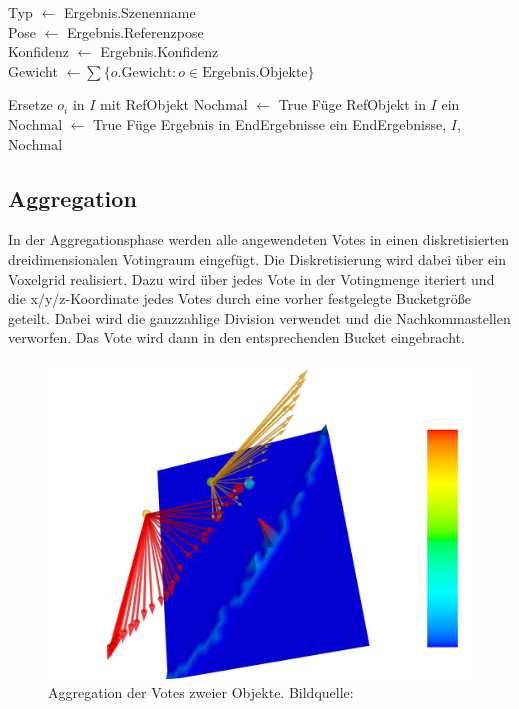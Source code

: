 \begin{algorithm}
\begin{algorithmic}[1]
{            Typ $\gets$ Ergebnis.Szenenname\\
            Pose $\gets$ Ergebnis.Referenzpose\\
            Konfidenz $\gets$ Ergebnis.Konfidenz\\
            Gewicht $\gets \sum \{ o.\text{Gewicht} : o \in \text{Ergebnis}.\text{Objekte} \}$}\strut\;
            \State Ersetze $o_i$ in $I$ mit RefObjekt\;
            \State Nochmal $\gets$ True\;
            \State Füge RefObjekt in $I$ ein\;
            \State Nochmal $\gets$ True\;
          \EndIf
        \EndIf
        \State Füge Ergebnis in EndErgebnisse ein\;
      \EndFor
    \EndFor
    \State \Return EndErgebnisse, $I$, Nochmal\;
  \end{algorithmic}
\end{algorithm}

\subsection{Aggregation}\label{ch:aggregation}

In der Aggregationsphase werden alle angewendeten Votes in einen diskretisierten dreidimensionalen Votingraum eingefügt.
Die Diskretisierung wird dabei über ein Voxelgrid realisiert.
Dazu wird über jedes Vote in der Votingmenge iteriert und die x/y/z-Koordinate jedes Votes durch eine vorher festgelegte Bucketgröße geteilt.
Dabei wird die ganzzahlige Division verwendet und die Nachkommastellen verworfen.
Das Vote wird dann in den entsprechenden Bucket eingebracht.

\begin{figure}
  \centering
  \includegraphics[width=.7\textwidth]{./bilder/paper_fotos/voting-nocluster-neu.png}
  \caption{Aggregation der Votes zweier Objekte. Bildquelle: \cite{P.MeissnerandR.RecklingandR.JaekelandS.R.Schmidt-RohrandR.Dillmann2013}}\label{fig:vote-aggr}
\end{figure}

